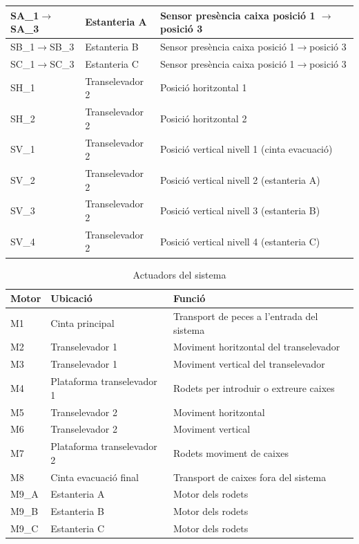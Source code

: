 \documentclass[a4paper,11pt,DIV=13,headings=normal,abstract=true,twoside=semi]{article}
\begin{document}
\begin{table}[H]
\begin{tabular}{|p{3cm}|p{5cm}|p{6cm}|}
SA\_1$\rightarrow$SA\_3 & Estanteria A & Sensor presència caixa posició 1 $\rightarrow$posició 3  \\ \hline
SB\_1$\rightarrow$SB\_3 & Estanteria B & Sensor presència caixa posició 1$\rightarrow$posició 3  \\ \hline
SC\_1$\rightarrow$SC\_3 & Estanteria C & Sensor presència caixa posició 1$\rightarrow$posició 3\\ \hline

SH\_1 & Transelevador 2 & Posició horitzontal 1 \\ \hline
SH\_2 & Transelevador 2 & Posició horitzontal 2 \\ \hline

SV\_1 & Transelevador 2 & Posició vertical nivell 1 (cinta evacuació)\\ \hline
SV\_2 & Transelevador 2 & Posició vertical nivell 2 (estanteria A)\\ \hline
SV\_3 & Transelevador 2 & Posició vertical nivell 3 (estanteria B)\\ \hline
SV\_4 & Transelevador 2 & Posició vertical nivell 4 (estanteria C)\\ \hline

\end{tabular}


\end{table}

\begin{table}[H]
\centering
\small

\caption{Actuadors del sistema}
\label{tab:tab_actuadors}
\begin{tabular}{|p{3cm}|p{5cm}|p{6cm}|}

\hline
\textbf{Motor} & \textbf{Ubicació} & \textbf{Funció} \\ \hline

M1 & Cinta principal & Transport de peces a l'entrada del sistema \\ \hline
M2 & Transelevador 1 & Moviment horitzontal del transelevador \\ \hline
M3 & Transelevador 1 & Moviment vertical del transelevador \\ \hline
M4 & Plataforma transelevador 1 & Rodets per introduir o extreure caixes \\ \hline
M5 & Transelevador 2 & Moviment horitzontal \\ \hline
M6 & Transelevador 2 & Moviment vertical \\ \hline
M7 & Plataforma transelevador 2 & Rodets moviment de caixes \\ \hline
M8 & Cinta evacuació final & Transport de caixes fora del sistema \\ \hline
M9\_A & Estanteria A & Motor dels rodets \\ \hline
M9\_B & Estanteria B & Motor dels rodets \\ \hline
M9\_C & Estanteria C & Motor dels rodets \\ \hline

\end{tabular}

\end{table}
\end{document}
